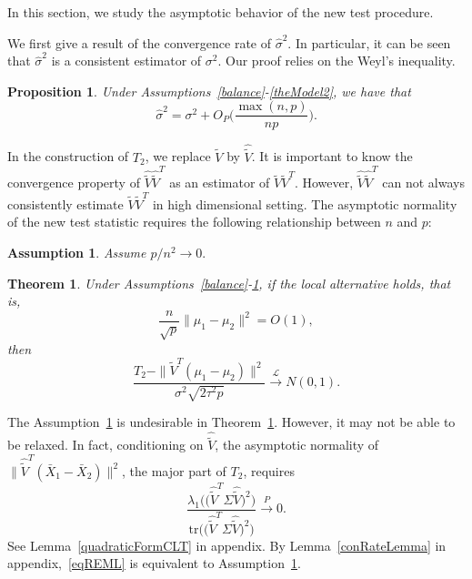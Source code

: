 \documentclass[review]{elsarticle}
\theoremstyle{plain}
\newtheorem{theorem}{\quad\quad Theorem}
\newtheorem{proposition}{\quad\quad Proposition}
\newtheorem{assumption}{\quad\quad Assumption}
\theoremstyle{definition}
\theoremstyle{remark}
\begin{document}
In this section, we study the asymptotic behavior of the new test procedure.


 We first give a result of the convergence rate of $\hat{\sigma}^2$.
 In particular, it can be seen that $\hat{\sigma}^2$ is a consistent estimator of $\sigma^2$.   
 Our proof relies on the Weyl's inequality.
\begin{proposition}\label{varianceEstimation}
    Under Assumptions~\ref{balance}-\ref{theModel2}, we have that%
    $$
    \hat{\sigma}^2=\sigma^2 + O_P\Big(\frac{\max (n,p)}{np}\Big).
    $$
\end{proposition}

In the construction of $T_2$, we replace $\tilde{V}$ by $\hat{\tilde{V}}$.
It is important to know the convergence property of $\hat{\tilde{V}}\hat{\tilde{V}}^T$ as an estimator of $\tilde{V}\tilde{V}^T$.
However, $\hat{\tilde{V}}\hat{\tilde{V}}^T$ can not always consistently estimate $\tilde{V}\tilde{V}^T$ in high dimensional setting.
 The asymptotic normality of the new test statistic requires the following relationship between $n$ and $p$:
\begin{assumption}\label{pAndN}
    Assume
    $
    {p}/{n^2}\to 0.
    $
\end{assumption}

 


\begin{theorem}\label{myPanpan}
    Under Assumptions~\ref{balance}-\ref{pAndN},
if the local alternative holds, that is,
    $$\frac{n}{\sqrt{p}}\|\mu_1-\mu_2\|^2=O(1),$$
then 
\begin{equation*}
        \frac{T_2-\|\tilde{V}^T(\mu_1-\mu_2)\|^2}{\sigma^2\sqrt{2\tau^2 p}}\xrightarrow{\mathcal{L}}N(0,1).
\end{equation*}
\end{theorem} 
The Assumption~\ref{pAndN} is undesirable in Theorem~\ref{myPanpan}.
However, it may not be able to be relaxed.
    In fact, conditioning on $\hat{\tilde{V}}$, the asymptotic normality of $\|\hat{\tilde{V}}^T(\bar{X}_1-\bar{X}_2)\|^2$, the major part of $T_2$, requires 
\begin{equation}\label{eqREML}
    \frac{\lambda_1\big(\big(\hat{\tilde{V}}^T \Sigma \hat{\tilde{V}}\big)^2\big)}{\mathrm{tr}\big(\big(\hat{\tilde{V}}^T \Sigma \hat{\tilde{V}}\big)^2\big)
}\xrightarrow{P} 0.
\end{equation}
See Lemma~\ref{quadraticFormCLT} in appendix. By Lemma~\ref{conRateLemma} in appendix,~\eqref{eqREML} is equivalent to Assumption~\ref{pAndN}.
\end{document}
